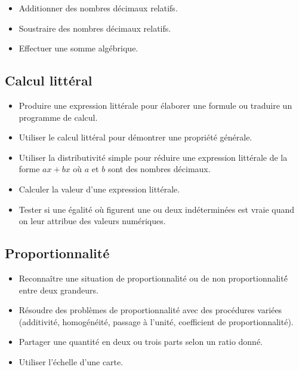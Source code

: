\documentclass[a4paper,12pt,fleqn]{article}
\begin{document}
\begin{itemize}[itemsep=1em]																																								
	\item {}	Additionner des nombres décimaux relatifs.																								
	\item {}	Soustraire des nombres décimaux relatifs.
	\item {} Effectuer une somme algébrique.
\end{itemize}

\subsection*{Calcul littéral}

\begin{itemize}[itemsep=1em]																								
	\item {}	Produire une expression littérale pour élaborer une formule ou traduire un programme de calcul.																								
	\item {}	Utiliser le calcul littéral pour démontrer une propriété générale.																								
	\item {}	Utiliser la distributivité simple pour réduire une expression littérale de la forme $ax + bx$ où $a$ et $b$ sont des nombres décimaux.																								
	\item {}	Calculer la valeur d’une expression littérale.																								
	\item {}	Tester si une égalité où figurent une ou deux indéterminées est vraie quand on leur attribue des valeurs numériques.																							
\end{itemize}

\newpage




\subsection*{Proportionnalité}

\begin{itemize}[itemsep=1em]
	\item {}Reconnaître une situation de proportionnalité ou de non proportionnalité́ entre deux grandeurs.
	\item {}Résoudre des problèmes de proportionnalité avec des procédures variées (additivité, homogénéité, passage à l’unité, coefficient de proportionnalité).
	\item {}Partager une quantité en deux ou trois parts selon un ratio donné.
	\item {}Utiliser l’échelle d’une carte.
\end{itemize}
\end{document}
